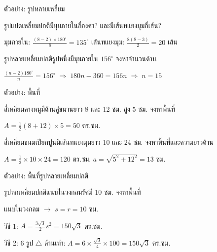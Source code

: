 \documentclass[11pt, aspectratio=169]{beamer}
\begin{document}
\begin{frame}{ตัวอย่าง: รูปหลายเหลี่ยม}
  \begin{exambox}[โจทย์ 1]
    รูปแปดเหลี่ยมปกติมีมุมภายในกี่องศา? และมีเส้นทแยงมุมกี่เส้น?
  \end{exambox}

  \begin{solbox}[วิธีทำ]
    มุมภายใน: $\frac{(8-2) \times 180^\circ}{8} = 135^\circ$ \qquad
    เส้นทแยงมุม: $\frac{8(8-3)}{2} = 20$ เส้น
  \end{solbox}

  \begin{exambox}[โจทย์ 2]
    รูปหลายเหลี่ยมปกติรูปหนึ่งมีมุมภายใน $156^\circ$ จงหาจำนวนด้าน
  \end{exambox}

  \begin{solbox}[วิธีทำ]
    $\frac{(n-2)180^\circ}{n} = 156^\circ \;\Rightarrow\; 180n-360=156n \;\Rightarrow\; n=15$
  \end{solbox}
\end{frame}

\begin{frame}{ตัวอย่าง: พื้นที่}
  \begin{exambox}[โจทย์]
    สี่เหลี่ยมคางหมูมีด้านคู่ขนานยาว 8 และ 12 ซม. สูง 5 ซม. จงหาพื้นที่
  \end{exambox}

  \begin{solbox}[วิธีทำ]
    $A = \frac{1}{2}(8+12) \times 5 = 50$ ตร.ซม.
  \end{solbox}

  \begin{exambox}[โจทย์]
    สี่เหลี่ยมขนมเปียกปูนมีเส้นทแยงมุมยาว 10 และ 24 ซม. จงหาพื้นที่และความยาวด้าน
  \end{exambox}

  \begin{solbox}[วิธีทำ]
    $A = \frac{1}{2} \times 10 \times 24 = 120$ ตร.ซม. \quad
    $a = \sqrt{5^2 + 12^2} = 13$ ซม.
  \end{solbox}
\end{frame}

\begin{frame}{ตัวอย่าง: พื้นที่รูปหลายเหลี่ยมปกติ}
  \begin{exambox}[โจทย์]
    รูปหกเหลี่ยมปกติแนบในวงกลมรัศมี 10 ซม. จงหาพื้นที่
  \end{exambox}

  \begin{solbox}[วิธีทำ]
    แนบในวงกลม $\rightarrow$ $s = r = 10$ ซม.

    วิธี 1: $A = \frac{3\sqrt{3}}{2}s^2 = 150\sqrt{3}$ ตร.ซม.

    วิธี 2: 6 รูป $\triangle$ ด้านเท่า: $A = 6 \times \frac{\sqrt{3}}{4} \times 100 = 150\sqrt{3}$ ตร.ซม.
  \end{solbox}
\end{frame}
\end{document}
